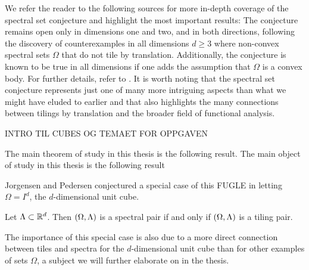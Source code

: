 \documentclass[../thesis.tex]{subfiles}
\begin{document}
We refer the reader to the following sources for more in-depth coverage of the spectral set conjecture and highlight the most important results: The conjecture remains open only in dimensions one and two, and in both directions, following the discovery of counterexamples in all dimensions $d \geq 3$ where non-convex spectral sets $\Omega$ that do not tile by translation. Additionally, the conjecture is known to be true in all dimensions if one adds the assumption that $\Omega$ is a convex body. For further details, refer to \cite{levFugledeConjectureConvex2022,dutkayReductionsSpectralSet2014,liDualityPropertiesSpectra2010,farkasFugledeConjectureExistence2006,kolountzakisStudyTranslationalTiling2003,jorgensenSpectralPairsCartesian2001}. It is worth noting that the spectral set conjecture represents just one of many more intriguing aspects than what we might have eluded to earlier and that \cite{kolountzakisStudyTranslationalTiling2003} also highlights the many connections between tilings by translation and the broader field of functional analysis. 



INTRO TIL CUBES OG TEMAET FOR OPPGAVEN

The main theorem of study in this thesis is the following result. 
The main object of study in this thesis is the following result 





Jorgensen and Pedersen conjectured a special case of this FUGLE in \cite{jorgensenSpectralPairsCartesian2001} letting $\Omega = I^d$, the $d$-dimensional unit cube. 
\begin{conjecture}
    Let $\Lambda\subset \mathbb{R}^d$. Then $(\Omega,\Lambda)$ is a spectral pair if and only if $(\Omega,\Lambda)$ is a tiling pair. 
\end{conjecture}

The importance of this special case is also due to a more direct connection between tiles and spectra for the $d$-dimensional unit cube than for other examples of sets $\Omega$, a subject we will further elaborate on in the thesis. 
\end{document}
